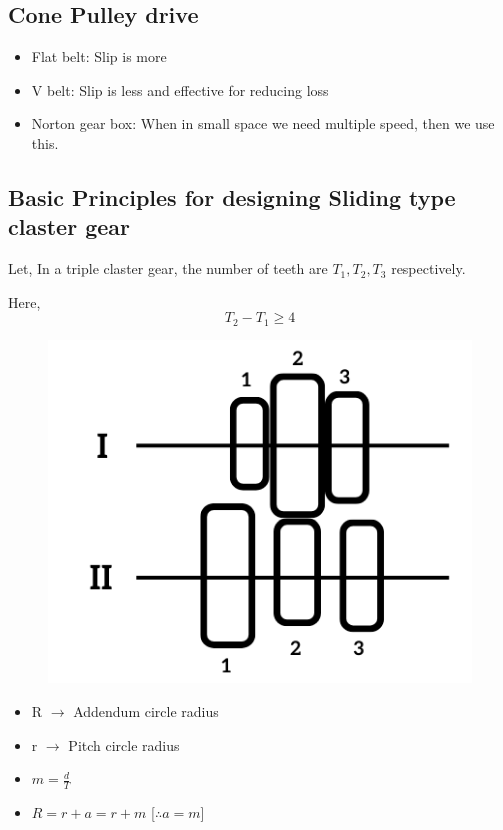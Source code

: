 \documentclass{article}
\begin{document}
\begin{multicols}{2}
  
  \subsection*{Cone Pulley drive}
  \begin{itemize}
    \item Flat belt: Slip is more 
    \item V belt: Slip is less and effective for reducing loss 
    \item Norton gear box: When in small space we need multiple speed, then we use this.
  \end{itemize}
  
  
  \subsection*{Basic Principles for designing Sliding type claster gear}
  Let, In a triple claster gear, the number of teeth are $T_1, T_2, T_3$ respectively. 
  
  Here, $$T_2 - T_1 \geq 4$$ 

  \begin{figure}[H]
    \begin{center}
      \includegraphics[width=\columnwidth]{img/claster_gear.png}
    \end{center}
  \end{figure}

  \begin{itemize}
    \item R $\rightarrow$ Addendum circle radius
    \item r $\rightarrow$ Pitch circle radius
    \item $m = \frac{d}{T}$
    \item $R = r + a = r + m$ [$\therefore a = m$]
  \end{itemize}


\end{multicols}
\end{document}
